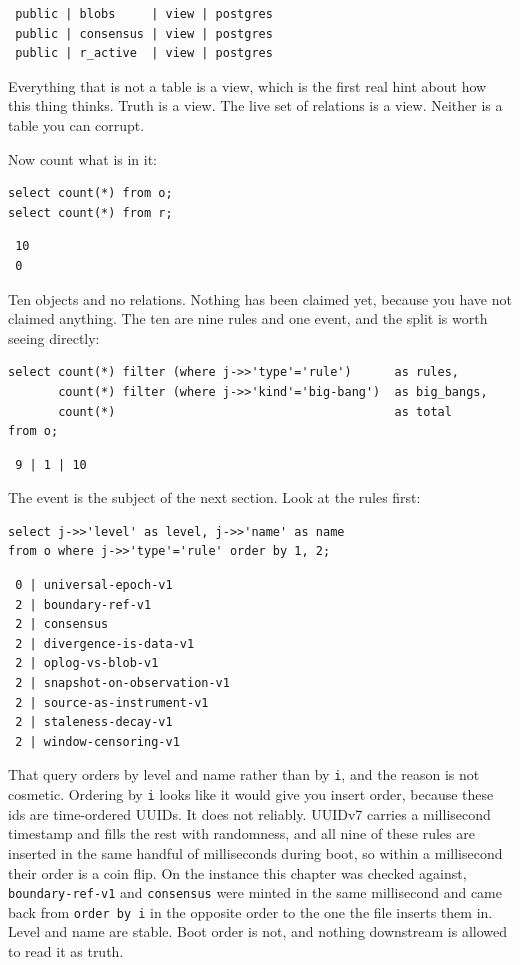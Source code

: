 \begin{verbatim}
 public | blobs     | view | postgres
 public | consensus | view | postgres
 public | r_active  | view | postgres
\end{verbatim}

Everything that is not a table is a view, which is the first real hint about how this thing thinks. Truth is a view. The live set of relations is a view. Neither is a table you can corrupt.

Now count what is in it:

\begin{verbatim}
select count(*) from o;
select count(*) from r;
\end{verbatim}

\begin{verbatim}
 10
 0
\end{verbatim}

Ten objects and no relations. Nothing has been claimed yet, because you have not claimed anything. The ten are nine rules and one event, and the split is worth seeing directly:

\begin{verbatim}
select count(*) filter (where j->>'type'='rule')      as rules,
       count(*) filter (where j->>'kind'='big-bang')  as big_bangs,
       count(*)                                       as total
from o;
\end{verbatim}

\begin{verbatim}
 9 | 1 | 10
\end{verbatim}

The event is the subject of the next section. Look at the rules first:

\begin{verbatim}
select j->>'level' as level, j->>'name' as name
from o where j->>'type'='rule' order by 1, 2;
\end{verbatim}

\begin{verbatim}
 0 | universal-epoch-v1
 2 | boundary-ref-v1
 2 | consensus
 2 | divergence-is-data-v1
 2 | oplog-vs-blob-v1
 2 | snapshot-on-observation-v1
 2 | source-as-instrument-v1
 2 | staleness-decay-v1
 2 | window-censoring-v1
\end{verbatim}

That query orders by level and name rather than by \verb|i|, and the reason is not cosmetic. Ordering by \verb|i| looks like it would give you insert order, because these ids are time-ordered UUIDs. It does not reliably. UUIDv7 carries a millisecond timestamp and fills the rest with randomness, and all nine of these rules are inserted in the same handful of milliseconds during boot, so within a millisecond their order is a coin flip. On the instance this chapter was checked against, \verb|boundary-ref-v1| and \verb|consensus| were minted in the same millisecond and came back from \verb|order by i| in the opposite order to the one the file inserts them in. Level and name are stable. Boot order is not, and nothing downstream is allowed to read it as truth.

